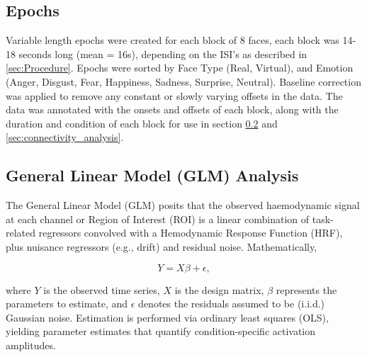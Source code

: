 \subsection{Epochs}
Variable length epochs were created for each block of 8 faces, each block was 14-18 seconds long (mean = 16s), depending on the ISI's as described in \ref{sec:Procedure}.
Epochs were sorted by Face Type (Real, Virtual), and Emotion (Anger, Disgust, Fear, Happiness, Sadness, Surprise, Neutral). 
Baseline correction was applied to remove any constant or slowly varying offsets in the data. 
The data was annotated with the onsets and offsets of each block, along with the duration and condition of each block for use in section \ref{sec:GLM} and \ref{sec:connectivity_analysis}.

\subsection{General Linear Model (GLM) Analysis}
\label{sec:GLM}
The General Linear Model (GLM) posits that the observed haemodynamic signal at each channel or Region of Interest (ROI) is a linear combination of task-related regressors convolved with a Hemodynamic Response Function (HRF), plus nuisance regressors (e.g., drift) and residual noise. Mathematically, 

\begin{equation}
Y = X\beta + \epsilon,
\end{equation}

where \( Y \) is the observed time series, \( X \) is the design matrix, \( \beta \) represents the parameters to estimate, and \( \epsilon \) denotes the residuals assumed to be (i.i.d.) Gaussian noise.
Estimation is performed via ordinary least squares (OLS), yielding parameter estimates that quantify condition-specific activation amplitudes.

